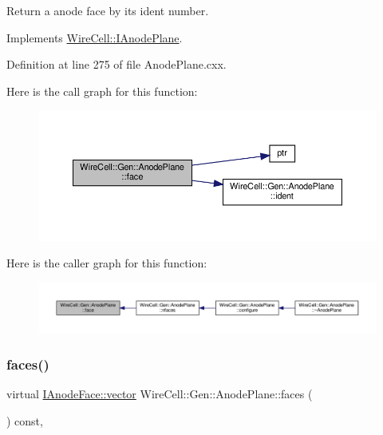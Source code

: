 Return a anode face by its ident number. 



Implements \hyperlink{class_wire_cell_1_1_i_anode_plane_ad420395805cd4a1c07253b535768fd5a}{Wire\+Cell\+::\+I\+Anode\+Plane}.



Definition at line 275 of file Anode\+Plane.\+cxx.

Here is the call graph for this function\+:
\nopagebreak
\begin{figure}[H]
\begin{center}
\leavevmode
\includegraphics[width=350pt]{class_wire_cell_1_1_gen_1_1_anode_plane_a429403f80c922cd168213c049ecadeea_cgraph}
\end{center}
\end{figure}
Here is the caller graph for this function\+:
\nopagebreak
\begin{figure}[H]
\begin{center}
\leavevmode
\includegraphics[width=350pt]{class_wire_cell_1_1_gen_1_1_anode_plane_a429403f80c922cd168213c049ecadeea_icgraph}
\end{center}
\end{figure}
\mbox{\label{class_wire_cell_1_1_gen_1_1_anode_plane_ad25ce7beb274de6570cbb104a1a67702}} 
\subsubsection{\texorpdfstring{faces()}{faces()}}
{\footnotesize\ttfamily virtual \hyperlink{class_wire_cell_1_1_i_component_a18978d88ce697af5941655a89660fd4e}{I\+Anode\+Face\+::vector} Wire\+Cell\+::\+Gen\+::\+Anode\+Plane\+::faces (\begin{DoxyParamCaption}{ }\end{DoxyParamCaption}) const\hspace{0.3cm}{\ttfamily [inline]}, {\ttfamily [virtual]}}




